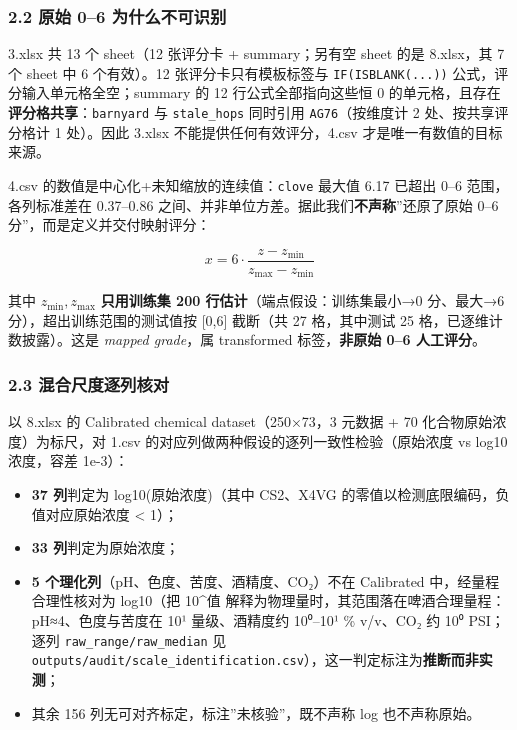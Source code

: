 \documentclass[
  UTF8]{ctexart}
\providecommand{\tightlist}{%
  \setlength{\itemsep}{0pt}\setlength{\parskip}{0pt}}
\begin{document}
\subsubsection{2.2 原始 0--6
为什么不可识别}\label{ux539fux59cb-06-ux4e3aux4ec0ux4e48ux4e0dux53efux8bc6ux522b}

3.xlsx 共 13 个 sheet（12 张评分卡 + summary；另有空 sheet 的是
8.xlsx，其 7 个 sheet 中 6 个有效）。12 张评分卡只有模板标签与
\texttt{IF(ISBLANK(...))} 公式，评分输入单元格全空；summary 的 12
行公式全部指向这些恒 0
的单元格，且存在\textbf{评分格共享}：\texttt{barnyard} 与
\texttt{stale\_hops} 同时引用 \texttt{AG76}（按维度计 2
处、按共享评分格计 1 处）。因此 3.xlsx 不能提供任何有效评分，4.csv
才是唯一有数值的目标来源。

4.csv 的数值是中心化+未知缩放的连续值：\texttt{clove} 最大值 6.17 已超出
0--6 范围，各列标准差在 0.37--0.86
之间、并非单位方差。据此我们\textbf{不声称}''还原了原始 0--6
分''，而是定义并交付映射评分：

\[x = 6\cdot\frac{z - z_{\min}}{z_{\max} - z_{\min}}\]

其中 \(z_{\min}, z_{\max}\) \textbf{只用训练集 200
行估计}（端点假设：训练集最小→0 分、最大→6 分），超出训练范围的测试值按
{[}0,6{]} 截断（共 27 格，其中测试 25 格，已逐维计数披露）。这是
\emph{mapped grade}，属 transformed 标签，\textbf{非原始 0--6
人工评分}。

\subsubsection{2.3
混合尺度逐列核对}\label{ux6df7ux5408ux5c3aux5ea6ux9010ux5217ux6838ux5bf9}

以 8.xlsx 的 Calibrated chemical dataset（250×73，3 元数据 + 70
化合物原始浓度）为标尺，对 1.csv
的对应列做两种假设的逐列一致性检验（原始浓度 vs log10 浓度，容差
1e-3）：

\begin{itemize}
\tightlist
\item
  \textbf{37 列}判定为 log10(原始浓度)（其中 CS2、X4VG
  的零值以检测底限编码，负值对应原始浓度 \textless{} 1）；
\item
  \textbf{33 列}判定为原始浓度；
\item
  \textbf{5 个理化列}（pH、色度、苦度、酒精度、CO₂）不在 Calibrated
  中，经量程合理性核对为 log10（把 10\^{}值
  解释为物理量时，其范围落在啤酒合理量程：pH≈4、色度与苦度在 10¹
  量级、酒精度约 10⁰--10¹ \% v/v、CO₂ 约 10⁰ PSI；逐列
  \texttt{raw\_range/raw\_median} 见
  \texttt{outputs/audit/scale\_identification.csv}），这一判定标注为\textbf{推断而非实测}；
\item
  其余 156 列无可对齐标定，标注''未核验''，既不声称 log 也不声称原始。
\end{itemize}
\end{document}
